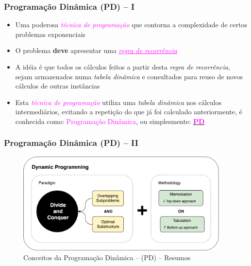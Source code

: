 \begin{frame}[fragile]

    \frametitle{Programação Dinâmica (PD) -- I}

   \begin{block}{}
     \begin{itemize}
      \item Uma poderosa \textcolor{magenta}{\textit{técnica de programação}}  que  contorna a complexidade de certos problemas
      exponenciais
      
       \pause
       \item O problema \textbf{deve} apresentar uma \textcolor{magenta}{\textit{\underline{regra de recorrência}}}
       
      \pause
      \item A idéia é que todos os cálculos feitos a partir desta \textit{regra de recorrência},
     sejam armazenados numa \textit{tabela dinâmica} e consultados para reuso de novos cálculos de outras
      instâncias
      
      \pause
      \item Esta \textcolor{magenta}{\textit{técnica de programação}} 
      utiliza uma \textit{tabela dinâmica} nos cálculos intermediários,
      evitando a repetição do que já foi calculado anteriormente, é conhecida como:
      \textcolor{magenta}{Programação Dinâmica}, ou simplesmente:
       \underline{\textcolor{magenta}{\textbf{PD}}}

    \end{itemize}
    
    \end{block}
    
\end{frame}



\begin{frame}[fragile]
\frametitle{Programação Dinâmica (PD) -- II}

\begin{figure}[!htb]
\centering
\includegraphics[width=0.95\textwidth, height=0.70\textheight]{figures/ilustra_PD.png}
\caption{Conceitos da Programação Dinâmica -- (PD) -- Resumos}
\end{figure}
\end{frame}






